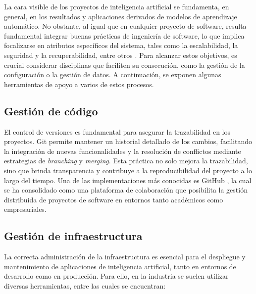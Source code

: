 La cara visible de los proyectos de inteligencia artificial se fundamenta, en general, en los resultados y aplicaciones derivados de modelos de aprendizaje automático. No obstante, al igual que en cualquier proyecto de software, resulta fundamental integrar buenas prácticas de ingeniería de software, lo que implica focalizarse en atributos específicos del sistema, tales como la escalabilidad, la seguridad y la recuperabilidad, entre otros \citep{sommerville_software_2015}. Para alcanzar estos objetivos, es crucial considerar disciplinas que faciliten su consecución, como la gestión de la configuración o la gestión de datos. A continuación, se exponen algunas herramientas de apoyo a varios de estos procesos.

\subsection{Gestión de código}

El control de versiones es fundamental para asegurar la trazabilidad en los proyectos. Git permite mantener un historial detallado de los cambios, facilitando la integración de nuevas funcionalidades y la resolución de conflictos mediante estrategias de \textit{branching} y \textit{merging}. Esta práctica no solo mejora la trazabilidad, sino que brinda transparencia y contribuye a la reproducibilidad del proyecto a lo largo del tiempo. Una de las implementaciones más conocidas es GitHub \citep{github_build_nodate}, la cual se ha consolidado como una plataforma de colaboración que posibilita la gestión distribuida de proyectos de software en entornos tanto académicos como empresariales.

\subsection{Gestión de infraestructura}
\label{sec:gestionDeinfraestructura}

La correcta administración de la infraestructura es esencial para el despliegue y mantenimiento de aplicaciones de inteligencia artificial, tanto en entornos de desarrollo como en producción. Para ello, en la industria se suelen utilizar diversas herramientas, entre las cuales se encuentran:

